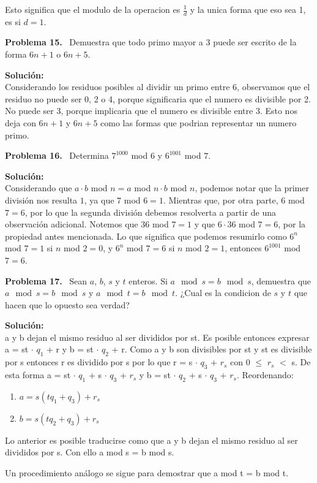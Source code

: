 \documentclass{article}
\newcounter{problem}
\newcounter{solution}
\newcommand\Problem[1]{%
  \stepcounter{problem}%
  \textbf{Problema #1.}~%
  \setcounter{solution}{0}%
}
\newcommand\TheSolution{%
  \textbf{Solución:}\\%
}
\begin{document}
Esto significa que el modulo de la operacion es $\frac{1}{d}$ y la unica forma
que eso sea 1, es si $d = 1$.

\Problem{15} Demuestra que todo primo mayor a 3 puede ser escrito de la forma
$6n + 1$ o $6n + 5$.

\TheSolution{} Considerando los residuos posibles al dividir un primo entre 6,
observamos que el residuo no puede ser 0, 2 o 4, porque significaria que el
numero es divisible por 2. No puede ser 3, porque implicaria que el numero es
divisible entre 3. Esto nos deja con $6n + 1$ y $6n + 5$ como las formas que
podrian representar un numero primo.

\Problem{16} Determina $7^{1000}$ mod $6$ y $6^{1001}$ mod $7$.

\TheSolution{}
Considerando que $a\cdot b$ mod $n=a$ mod $n\cdot b$ mod $n$, podemos notar
que la primer divisi\'on nos resulta $1$, ya que $7$ mod $6=1$. Mientras que,
por otra parte, $6$ mod $7=6$, por lo que la segunda divisi\'on debemos
resolverta a partir de una observaci\'on adicional. Notemos que $36$ mod $7=1$
y que $6\cdot 36$ mod $7=6$, por la propiedad antes mencionada. Lo que
significa que podemos resumirlo como $6^{n}$ mod $7=1$ si $n$ mod $2=0$, y
$6^{n}$ mod $7=6$ si $n$ mod $2=1$, entonces $6^{1001}$ mod $7=6$.

\Problem{17} Sean $a$, $b$, $s$ y $t$ enteros. Si $a \mod s = b \mod s$,
demuestra que $a \mod s = b \mod s$ y $a \mod t = b \mod t$. ¿Cual es la
condicion de $s$ y $t$ que hacen que lo opuesto sea verdad?

\TheSolution{}
a y b dejan el mismo residuo al ser divididos por st. Es posible entonces
expresar a = st $\cdot$ $q_{1}$ + r y b = st $\cdot$ $q_{2}$ + r. Como a  y b
son divisibles por st y st es divisible por s entonces r es dividido por s por
lo que r = s $\cdot$ $q_{3}$ + $r_{s}$ con 0 $\leq$ $r_{s}$ $<$ s. De esta
forma a = st $\cdot$ $q_{1}$ + s $\cdot$ $q_{3}$ + $r_{s}$ y b = st $\cdot$
$q_{2}$ + s $\cdot$ $q_{3}$ + $r_{s}$. Reordenando:

\begin{enumerate}
  \item $a = s(tq_{1} + q_{3}) + r_{s}$
  \item $b = s(tq_{2} + q_{3}) + r_{s}$
\end{enumerate}

Lo anterior es posible traducirse como que a y b dejan el mismo
residuo al ser divididos por s. Con ello a mod s = b  mod s. 

Un procedimiento análogo se sigue para demostrar que a mod t = b mod t.
\end{document}
